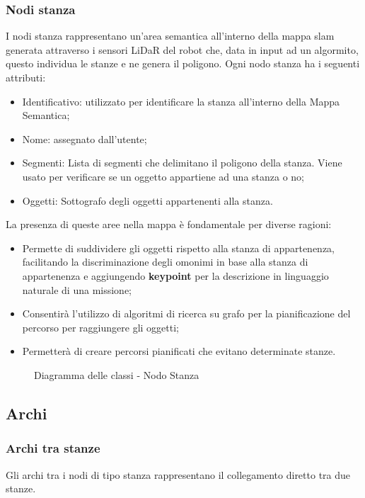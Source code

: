 \subsubsection{Nodi stanza}
I nodi stanza rappresentano un'area semantica all'interno della mappa slam generata attraverso i sensori LiDaR del robot che, data in input ad un algormito, questo individua le stanze e ne genera il poligono. 
Ogni nodo stanza ha i seguenti attributi:
\begin{itemize}
  \item Identificativo: utilizzato per identificare la stanza all'interno della Mappa Semantica;
  \item Nome: assegnato dall'utente;
  \item Segmenti: Lista di segmenti che delimitano il poligono della stanza. Viene usato per verificare se un oggetto appartiene ad una stanza o no;
  \item Oggetti: Sottografo degli oggetti appartenenti alla stanza.
\end{itemize}
La presenza di queste aree nella mappa è fondamentale per diverse ragioni:
\begin{itemize}
  \item Permette di suddividere gli oggetti rispetto alla stanza di appartenenza, facilitando la discriminazione degli omonimi in base alla stanza di appartenenza e aggiungendo \textbf{keypoint} per la descrizione in linguaggio naturale di una missione;
  \item Consentirà l'utilizzo di algoritmi di ricerca su grafo per la pianificazione del percorso per raggiungere gli oggetti;
  \item Permetterà di creare percorsi pianificati che evitano determinate stanze.
\end{itemize}

\begin{figure}[h]
  \centering
  \caption{Diagramma delle classi - Nodo Stanza}
\end{figure}
\subsection{Archi}
\subsubsection{Archi tra stanze}
Gli archi tra i nodi di tipo stanza rappresentano il collegamento diretto tra due stanze.

